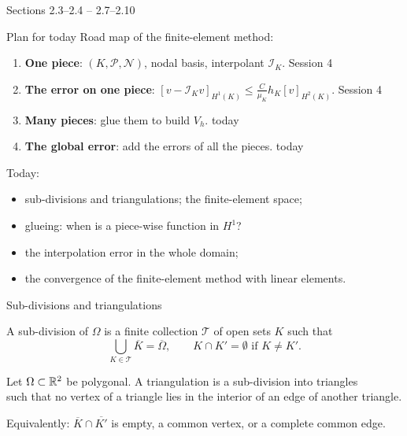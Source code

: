 
{Sections 2.3--2.4}
{--}
{2.7--2.10}

\begin{frame}{Plan for today}
    Road map of the finite-element method:
    \begin{enumerate}
        \item \textbf{One piece}: $(K, \mathcal P, \mathcal N)$, nodal basis, interpolant $\mathcal I_K$. \hfill Session 4
        \item \textbf{The error on one piece}: $[v - \mathcal I_K v]_{H^1(K)} \le \frac{C}{\mu_K} h_K [v]_{H^2(K)}$. \hfill Session 4
        \item \textbf{Many pieces}: glue them to build $V_h$. \hfill {\color{mnuaccent}today}
        \item \textbf{The global error}: add the errors of all the pieces. \hfill {\color{mnuaccent}today}
    \end{enumerate}
    \bigskip
    Today:
    \begin{itemize}
        \item sub-divisions and triangulations; the finite-element space;
        \item glueing: when is a piece-wise function in $H^1$?
        \item the interpolation error in the whole domain;
        \item the convergence of the finite-element method with linear elements.
    \end{itemize}
\end{frame}

\begin{frame}{Sub-divisions and triangulations}
    \begin{definition}
        A sub-division of $\Omega$ is a finite collection $\mathcal T$ of open sets $K$ such that
        \[
            \bigcup_{K \in \mathcal T} \overline K = \overline \Omega, \qquad K \cap K' = \emptyset \text{ if } K \ne K'.
        \]
    \end{definition}
    \begin{definition}[Triangulation]
        Let $\Omega \subset {\mathbb R}^2$ be polygonal. A triangulation is a sub-division into triangles\\
        such that no vertex of a triangle lies in the interior of an edge of another triangle.
    \end{definition}
    \begin{center}
    \end{center}
    Equivalently: $\overline K \cap \overline{K'}$ is empty, a common vertex, or a complete common edge.
\end{frame}

